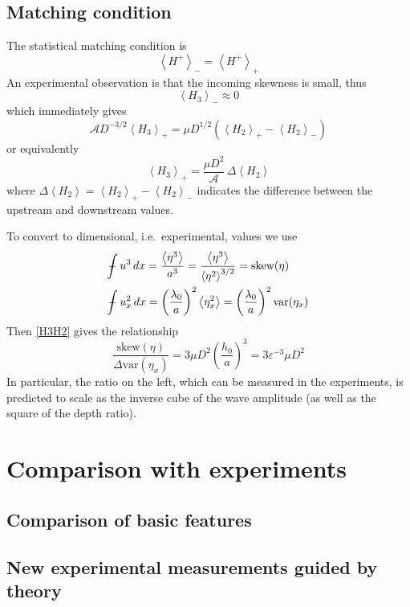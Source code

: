 \documentclass[11pt]{article}
\newcommand{\mean}[1]{\left< #1 \right>}
\newcommand{\eps}{\varepsilon}
\newcommand{\meanup}[1]{\mean{#1}_{-}}
\newcommand{\meandn}[1]{\mean{#1}_{+}}
\newcommand{\skw}{\text{skew}}
\newcommand{\var}{\text{var}}
\newcommand{\ampp}{\mathcal{A}}
\newcommand{\Hp}{H^{+}}
\def\Xint#1{\mathchoice
   {\XXint\displaystyle\textstyle{#1}}%
   {\XXint\textstyle\scriptstyle{#1}}%
   {\XXint\scriptstyle\scriptscriptstyle{#1}}%
   {\XXint\scriptscriptstyle\scriptscriptstyle{#1}}%
   \!\int}
\def\XXint#1#2#3{{\setbox0=\hbox{$#1{#2#3}{\int}$}
     \vcenter{\hbox{$#2#3$}}\kern-.5\wd0}}
\def\dashint{\Xint-}
\newcommand{\intt}{\dashint}%
\newcommand{\dx}{\, dx}
\begin{document}
\subsection{Matching condition}

The statistical matching condition is
\begin{equation}
\meanup{\Hp} = \meandn{\Hp}
\end{equation}
An experimental observation is that the incoming skewness is small, thus
\begin{equation}
\meanup{H_3} \approx 0
\end{equation}
which immediately gives
\begin{equation}
\ampp D^{-3/2} \meandn{H_3} = \mu D^{1/2} \left( \meandn{H_2} - \meanup{H_2} \right)
\end{equation}
or equivalently
\begin{equation}
\label{H3H2}
\meandn{H_3} = \frac{\mu D^{2}}{\ampp} \, \Delta \mean{H_2}
\end{equation}
where $\Delta \mean{H_2} =  \meandn{H_2} - \meanup{H_2}$  indicates the difference between the upstream and downstream values.

To convert to dimensional, i.e.~experimental, values we use
\begin{align}
& \intt u^3 \dx = \frac{\mean{\eta^3}}{a^3} = 
\frac{\mean{\eta^3}}{\mean{\eta^2}^{3/2}} = \skw(\eta) \\
& \intt u_x^2 \dx = \left(\frac{\lambda_0}{a} \right)^2 \mean{\eta_x^2} 
= \left(\frac{\lambda_0}{a} \right)^2 \var(\eta_x)
\end{align}
Then \eqref{H3H2} gives the relationship
\begin{equation}
\frac{\skw(\eta)}{\Delta \var(\eta_x)} =
3 \mu D^2 \left( \frac{h_0}{a} \right)^3 = 3 \eps^{-3} \mu D^2
\end{equation}
In particular, the ratio on the left, which can be measured in the experiments, is predicted to scale as the inverse cube of the wave amplitude (as well as the square of the depth ratio).

\section{Comparison with experiments}

\subsection{Comparison of basic features}

\subsection{New experimental measurements guided by theory}

%
%
\end{document}
